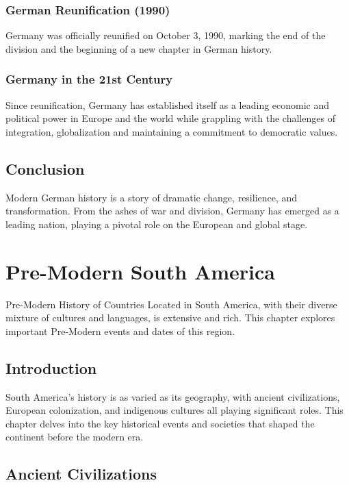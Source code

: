 \documentclass[a4paper,12pt]{book}
\begin{document}
\subsection{German Reunification (1990)}
Germany was officially reunified on October 3, 1990, marking the end of the division and the beginning of a new chapter in German history.

\subsection{Germany in the 21st Century}
Since reunification, Germany has established itself as a leading economic and political power in Europe and the world while grappling with the challenges of integration, globalization and maintaining a commitment to democratic values.

\section{Conclusion}
\label{sec:conclusion-modern-germany}
Modern German history is a story of dramatic change, resilience, and transformation. From the ashes of war and division, Germany has emerged as a leading nation, playing a pivotal role on the European and global stage.

\chapter{Pre-Modern South America}
\label{ch:pre-modern-history-south-america}

Pre-Modern History of Countries Located in South America, with their diverse mixture of cultures and languages, is extensive and rich. This chapter explores important Pre-Modern events and dates of this region.

\section{Introduction}
\label{sec:introduction-pre-modern-south-america}
South America’s history is as varied as its geography, with ancient civilizations, European colonization, and indigenous cultures all playing significant roles. This chapter delves into the key historical events and societies that shaped the continent before the modern era.

\section{Ancient Civilizations}
\label{sec:ancient-civilizations-south-america}
\end{document}
